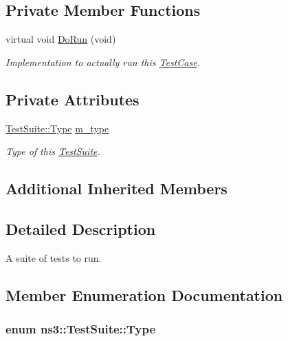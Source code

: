 \subsection*{Private Member Functions}
\begin{DoxyCompactItemize}
\item 
virtual void \hyperlink{classns3_1_1TestSuite_aa465ac6b0e9cd11022525091f78f3cf0}{Do\+Run} (void)
\begin{DoxyCompactList}\small\item\em Implementation to actually run this \hyperlink{classns3_1_1TestCase}{Test\+Case}. \end{DoxyCompactList}\end{DoxyCompactItemize}
\subsection*{Private Attributes}
\begin{DoxyCompactItemize}
\item 
\hyperlink{classns3_1_1TestSuite_a1ebfcab34ec8161e085e8e3a1855eae0}{Test\+Suite\+::\+Type} \hyperlink{classns3_1_1TestSuite_a6018d5cca7d5773a88660b42ebbd30ba}{m\+\_\+type}
\begin{DoxyCompactList}\small\item\em Type of this \hyperlink{classns3_1_1TestSuite}{Test\+Suite}. \end{DoxyCompactList}\end{DoxyCompactItemize}
\subsection*{Additional Inherited Members}


\subsection{Detailed Description}
A suite of tests to run. 

\subsection{Member Enumeration Documentation}
\subsubsection[{\texorpdfstring{Type}{Type}}]{\setlength{\rightskip}{0pt plus 5cm}enum {\bf ns3\+::\+Test\+Suite\+::\+Type}}\hypertarget{classns3_1_1TestSuite_a1ebfcab34ec8161e085e8e3a1855eae0}{}\label{classns3_1_1TestSuite_a1ebfcab34ec8161e085e8e3a1855eae0}


